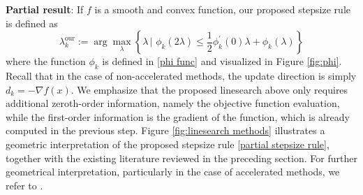 \documentclass[11pt, a4paper, oneside, reqno]{amsart}
\begin{document}
\textbf{Partial result}: If $f$ is a smooth and convex function, our proposed stepsize rule is defined as
        \begin{equation} \label{partial stepsize rule}
          \lambda_{k}^{\mathrm{our}} := \arg\max\limits_{\lambda} \left \{\lambda \,|\,\,  \phi_k(2\lambda) \leq \dfrac{1}{2}\phi_k^{\prime}(0)\lambda + \phi_k(\lambda) \right\}
        \end{equation}
        where the function $\phi_k$ is defined in \eqref{phi func} and visualized in Figure \ref{fig:phi}. Recall that in the case of non-accelerated methods, the update direction is simply $d_k = -\nabla f(x)$. We emphasize that the proposed linesearch above only requires additional zeroth-order information, namely the objective function evaluation, while the first-order information is the gradient of the function, which is already computed in the previous step. Figure \ref{fig:linesearch methods} illustrates a geometric interpretation of the proposed stepsize rule \eqref{partial stepsize rule}, together with the existing literature reviewed in the preceding section. For further geometrical interpretation, particularly in the case of accelerated methods, we refer to \cite{bubeck2015geometric}.
\end{document}
